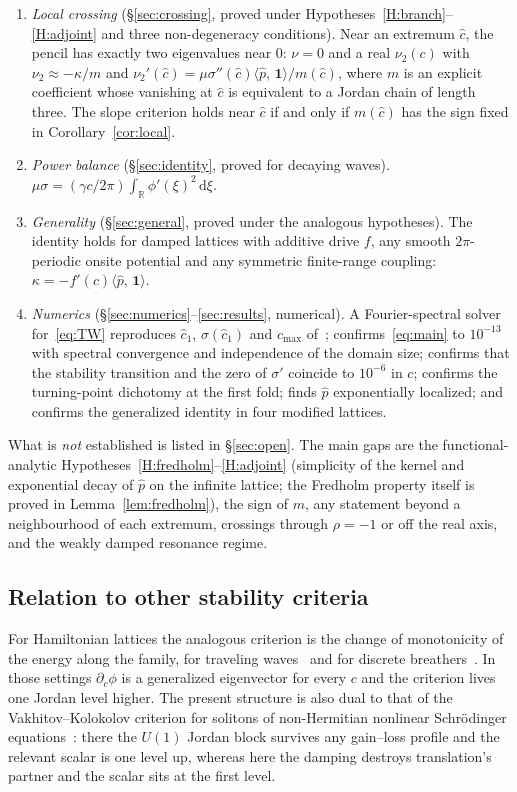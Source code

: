 \documentclass[11pt]{article}
\theoremstyle{plain}
\theoremstyle{definition}
\theoremstyle{remark}
\newcommand{\ip}[2]{\langle #1,\,#2\rangle}
\newcommand{\ph}{\hat p}
\newcommand{\dd}{\mathrm{d}}
\newcommand{\R}{\mathbb{R}}
\newcommand{\one}{\mathbf 1}
\newcommand{\chat}{\hat c_1}
\newcommand{\cmax}{c_{\max}}
\newcommand{\tagP}{\textsf{proved}}
\newcommand{\tagC}[1]{\textsf{proved under #1}}
\newcommand{\tagN}{\textsf{numerical}}
\begin{document}
\begin{enumerate}[leftmargin=2.2em,label=(\roman*)]
  which factor of~\eqref{eq:main} vanishes.
\item \emph{Local crossing} (\S\ref{sec:crossing},
  \tagC{Hypotheses~\ref{H:branch}--\ref{H:adjoint} and three non-degeneracy conditions}).
  Near an extremum $\hat c$, the pencil has exactly two eigenvalues near $0$: $\nu=0$ and a
  real $\nu_2(c)$ with $\nu_2\approx-\kappa/m$ and
  $\nu_2'(\hat c)=\mu\sigma''(\hat c)\ip{\ph}{\one}/m(\hat c)$, where $m$ is an explicit
  coefficient whose vanishing at $\hat c$ is equivalent to a Jordan chain of length three.
  The slope criterion holds near $\hat c$ if and only if $m(\hat c)$ has the sign fixed in
  Corollary~\ref{cor:local}.
\item \emph{Power balance} (\S\ref{sec:identity}, \tagP{} for decaying waves).
  $\mu\sigma=(\gamma c/2\pi)\int_\R\phi'(\xi)^2\,\dd\xi$.
\item \emph{Generality} (\S\ref{sec:general}, \tagC{the analogous hypotheses}).
  The identity holds for damped lattices with additive drive $f$, any smooth $2\pi$-periodic
  onsite potential and any symmetric finite-range coupling: $\kappa=-f'(c)\ip{\ph}{\one}$.
\item \emph{Numerics} (\S\ref{sec:numerics}--\ref{sec:results}, \tagN). A Fourier-spectral
  solver for~\eqref{eq:TW} reproduces $\chat$, $\sigma(\chat)$ and $\cmax$ of~\cite{VCKX20};
  confirms~\eqref{eq:main} to $10^{-13}$ with spectral convergence and independence of the
  domain size; confirms that the stability transition and the zero of $\sigma'$ coincide to
  $10^{-6}$ in $c$; confirms the turning-point dichotomy at the first fold; finds $\ph$
  exponentially localized; and confirms the generalized identity in four modified lattices.
\end{enumerate}

What is \emph{not} established is listed in \S\ref{sec:open}. The main gaps are the
functional-analytic Hypotheses~\ref{H:fredholm}--\ref{H:adjoint} (simplicity of the kernel and
exponential decay of $\ph$ on the infinite lattice; the Fredholm property itself is proved in
Lemma~\ref{lem:fredholm}), the sign of $m$, any statement beyond a neighbourhood of each
extremum, crossings through $\rho=-1$ or off the real axis, and the weakly damped resonance
regime.

\subsection{Relation to other stability criteria}

For Hamiltonian lattices the analogous criterion is the change of monotonicity of the
energy along the family, for traveling waves~\cite{FP04,CKVX17,XCKV18} and for discrete
breathers~\cite{KCP16}. In those settings $\partial_c\phi$ is a generalized eigenvector for
every $c$ and the criterion lives one Jordan level higher. The present structure is also
dual to that of the Vakhitov--Kolokolov criterion for solitons of non-Hermitian nonlinear
Schr\"odinger equations~\cite{VK-NH}: there the $U(1)$ Jordan block survives any gain--loss
profile and the relevant scalar is one level up, whereas here the damping destroys
translation's partner and the scalar sits at the first level.
\end{document}
